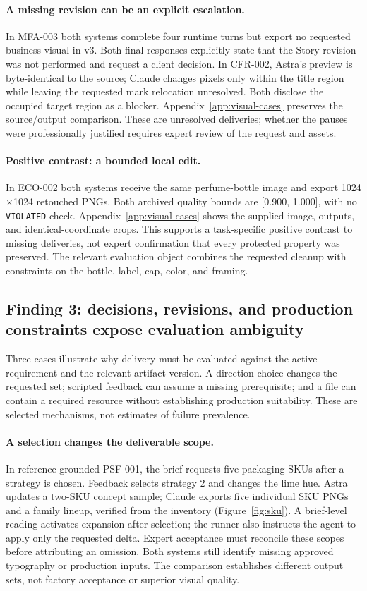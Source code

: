 \paragraph{A missing revision can be an explicit escalation.}
In MFA-003 both systems complete four runtime turns but export no requested business visual in v3. Both final responses explicitly state that the Story revision was not performed and request a client decision. In CFR-002, Astra's preview is byte-identical to the source; Claude changes pixels only within the title region while leaving the requested mark relocation unresolved. Both disclose the occupied target region as a blocker. Appendix~\ref{app:visual-cases} preserves the source/output comparison. These are unresolved deliveries; whether the pauses were professionally justified requires expert review of the request and assets.

\paragraph{Positive contrast: a bounded local edit.}
In ECO-002 both systems receive the same perfume-bottle image and export 1024$\times$1024 retouched PNGs. Both archived quality bounds are [0.900, 1.000], with no \texttt{VIOLATED} check. Appendix~\ref{app:visual-cases} shows the supplied image, outputs, and identical-coordinate crops. This supports a task-specific positive contrast to missing deliveries, not expert confirmation that every protected property was preserved. The relevant evaluation object combines the requested cleanup with constraints on the bottle, label, cap, color, and framing.

\subsection{Finding 3: decisions, revisions, and production constraints expose evaluation ambiguity}
\label{sec:revision}
Three cases illustrate why delivery must be evaluated against the active requirement and the relevant artifact version. A direction choice changes the requested set; scripted feedback can assume a missing prerequisite; and a file can contain a required resource without establishing production suitability. These are selected mechanisms, not estimates of failure prevalence.

\paragraph{A selection changes the deliverable scope.}
In reference-grounded PSF-001, the brief requests five packaging SKUs after a strategy is chosen. Feedback selects strategy 2 and changes the lime hue. Astra updates a two-SKU concept sample; Claude exports five individual SKU PNGs and a family lineup, verified from the inventory (Figure~\ref{fig:sku}). A brief-level reading activates expansion after selection; the runner also instructs the agent to apply only the requested delta. Expert acceptance must reconcile these scopes before attributing an omission. Both systems still identify missing approved typography or production inputs. The comparison establishes different output sets, not factory acceptance or superior visual quality.

